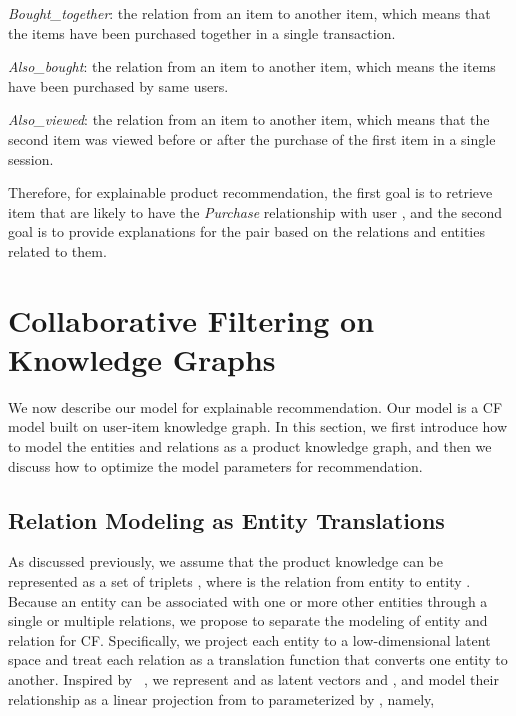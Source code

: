 \documentclass[algorithms,article,accept,moreauthors,pdftex,10pt,a4paper]{Definitions/mdpi}
\begin{document}
 \textit{Bought\_together}: the relation from an item to another item, which means that the items have been purchased together in a single transaction.

 \textit{Also\_bought}: the relation from an item to another item, which means the items have been purchased by same users.

 \textit{Also\_viewed}: the relation from an item to another item, which means that the second item was viewed before or after the purchase of the first item in a single session.

\vspace{6 pt} Therefore, for explainable product recommendation, the first goal is to retrieve item  that are likely to have the \textit{Purchase}
 relationship with user , and the second goal is to provide explanations for the  pair based on the relations and entities related to them.









\section{Collaborative Filtering on Knowledge Graphs}\label{sec:model}

We now describe our model for explainable recommendation.
Our model is a CF model built on user-item knowledge graph.
In this section, we first introduce how to model the entities and relations as a product knowledge graph, and then we discuss how to optimize the model parameters for recommendation. 





\subsection{Relation Modeling as Entity Translations}\label{sec:trans}

As discussed previously, we assume that the product knowledge can be represented as a set of triplets , where  is the relation from entity  to entity .
Because an entity can be associated with one or more other entities through a single or multiple relations, we propose to separate the modeling of entity and relation for CF.
Specifically, we project each entity to a low-dimensional latent space and treat each relation as a translation function that converts one entity to another.
Inspired by ~\cite{bordes2013translating}, we represent  and  as latent vectors  and , and model their relationship  as a linear projection from  to  parameterized by , namely,
\end{document}
